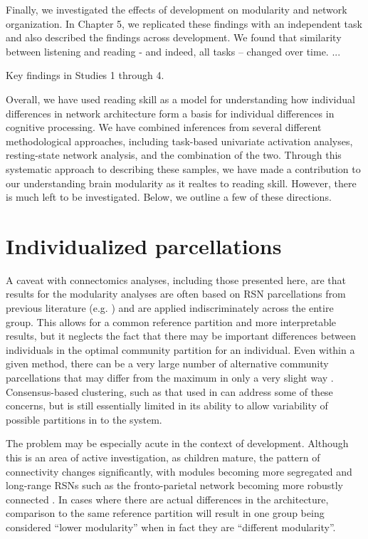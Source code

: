 Finally, we investigated the effects of development on modularity and network organization. In Chapter 5, we replicated these findings with an independent task and also described the findings across development. We found that similarity between listening and reading - and indeed, all tasks -- changed over time. ...

\begin{table}[t]
	\renewcommand{\tabcolsep}{0.2cm}
	\centering
	
	\caption[Key findings in Studies 1 through 4.]{Key findings in Studies 1 through 4.}
	\label{table:ch6-key-findings}
\end{table}

Overall, we have used reading skill as a model for understanding how individual differences in network architecture form a basis for individual differences in cognitive processing. We have combined inferences from several different methodological approaches, including task-based univariate activation analyses, resting-state network analysis, and the combination of the two. Through this systematic approach to describing these samples, we have made a contribution to our understanding brain modularity as it realtes to reading skill. However, there is much left to be investigated. Below, we outline a few of these directions.

\section{Individualized parcellations}

A caveat with connectomics analyses, including those presented here, are that results for the modularity analyses are often based on RSN parcellations from previous literature (e.g. \citep{Power2011}) and are applied indiscriminately across the entire group. This allows for a common reference partition and more interpretable results, but it neglects the fact that there may be important differences between individuals in the optimal community partition for an individual. Even within a given method, there can be a very large number of alternative community parcellations that may differ from the maximum in only a very slight way \citep{Good2010}. Consensus-based clustering, such as that used in \citep{Power2011} can address some of these concerns, but is still essentially limited in its ability to allow variability of possible partitions in to the system. 

The problem may be especially acute in the context of development. Although this is an area of active investigation, as children mature, the pattern of connectivity changes significantly, with modules becoming more segregated and long-range RSNs such as the fronto-parietal network becoming more robustly connected \citep{Cao2016}. In cases where there are actual differences in the architecture, comparison to the same reference partition will result in one group being considered ``lower modularity'' when in fact they are ``different modularity''.  

